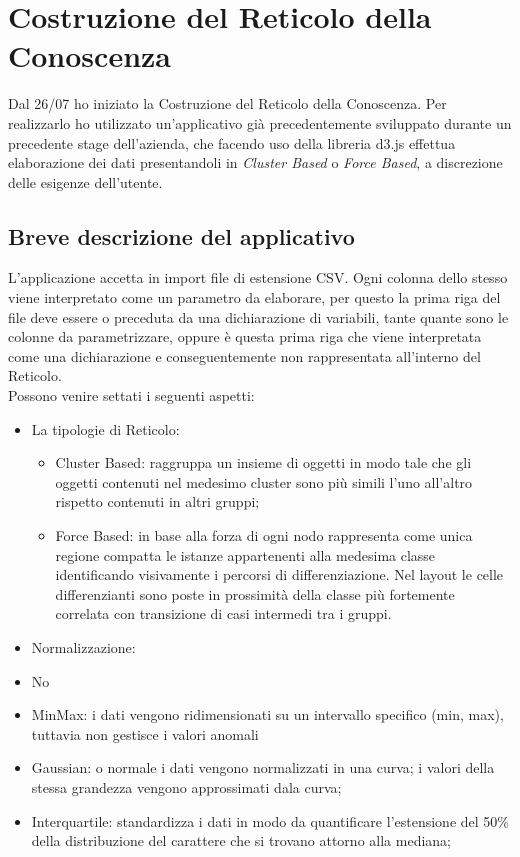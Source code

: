\section{Costruzione del Reticolo della Conoscenza}
\label{Costruzione del Reticolo della Conoscenza}
Dal 26/07 ho iniziato la Costruzione del Reticolo della Conoscenza. Per realizzarlo ho utilizzato un'applicativo gi\`a precedentemente sviluppato durante un precedente stage dell'azienda, che facendo uso della libreria d3.js effettua elaborazione dei dati presentandoli in \textit{Cluster Based} o \textit{Force Based}, a discrezione delle esigenze dell'utente.

\subsection{Breve descrizione del applicativo}
\label{Breve descrizione dell'applicativo}
L'applicazione accetta in import file di estensione CSV. Ogni colonna dello stesso viene interpretato come un parametro da elaborare, per questo la prima riga del file deve essere o preceduta da una dichiarazione di variabili, tante quante sono le colonne da parametrizzare, oppure \`e questa prima riga che viene interpretata come una dichiarazione e conseguentemente non rappresentata all'interno del Reticolo.\\
Possono venire settati i seguenti aspetti:
\begin{itemize}
\item La tipologie di Reticolo:
\begin{itemize}
\item Cluster Based: raggruppa un insieme di oggetti in modo tale che gli oggetti contenuti nel medesimo cluster sono pi\`u simili l'uno all'altro rispetto contenuti in altri gruppi;
\item Force Based: in base alla forza di ogni nodo rappresenta come unica regione compatta le istanze appartenenti alla medesima classe identificando visivamente i percorsi di differenziazione. Nel layout le celle differenzianti sono poste in prossimit\`a della classe pi\`u fortemente correlata con transizione di casi intermedi tra i gruppi.
\end{itemize}
\item Normalizzazione:
\item No
\item MinMax: i dati vengono ridimensionati su un intervallo specifico (min, max), tuttavia non gestisce i valori anomali
\item Gaussian: o normale i dati vengono normalizzati in una curva; i valori della stessa grandezza vengono approssimati dala curva;
\item Interquartile: standardizza i dati in modo da quantificare l'estensione del 50\% della distribuzione del carattere che si trovano attorno alla mediana;
\end{itemize}
